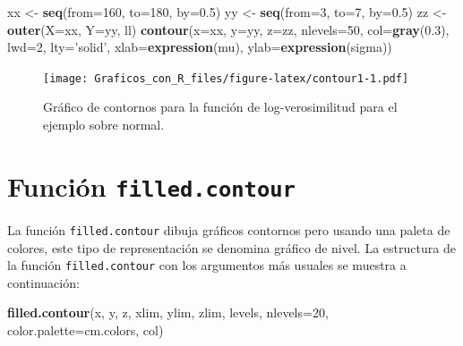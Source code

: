 \documentclass[10pt,]{krantz}
\makeatletter
\newenvironment{Shaded}{\begin{snugshade}}{\end{snugshade}}
\newcommand{\KeywordTok}[1]{\textcolor[rgb]{0.13,0.29,0.53}{\textbf{#1}}}
\newcommand{\DataTypeTok}[1]{\textcolor[rgb]{0.13,0.29,0.53}{#1}}
\newcommand{\DecValTok}[1]{\textcolor[rgb]{0.00,0.00,0.81}{#1}}
\newcommand{\FloatTok}[1]{\textcolor[rgb]{0.00,0.00,0.81}{#1}}
\newcommand{\StringTok}[1]{\textcolor[rgb]{0.31,0.60,0.02}{#1}}
\newcommand{\NormalTok}[1]{#1}
\newenvironment{kframe}{%
\medskip{}
\setlength{\fboxsep}{.8em}
 \def\at@end@of@kframe{}%
 \ifinner\ifhmode%
  \def\at@end@of@kframe{\end{minipage}}%
  \begin{minipage}{\columnwidth}%
 \fi\fi%
 \def\FrameCommand##1{\hskip\@totalleftmargin \hskip-\fboxsep
 \colorbox{shadecolor}{##1}\hskip-\fboxsep
     \hskip-\linewidth \hskip-\@totalleftmargin \hskip\columnwidth}%
 \MakeFramed {\advance\hsize-\width
   \@totalleftmargin\z@ \linewidth\hsize
   \@setminipage}}%
 {\par\unskip\endMakeFramed%
 \at@end@of@kframe}
\renewenvironment{Shaded}{\begin{kframe}}{\end{kframe}}
\makeatother
\begin{document}
\begin{Shaded}
\begin{Highlighting}[]
\NormalTok{xx <-}\StringTok{ }\KeywordTok{seq}\NormalTok{(}\DataTypeTok{from=}\DecValTok{160}\NormalTok{, }\DataTypeTok{to=}\DecValTok{180}\NormalTok{, }\DataTypeTok{by=}\FloatTok{0.5}\NormalTok{)}
\NormalTok{yy <-}\StringTok{ }\KeywordTok{seq}\NormalTok{(}\DataTypeTok{from=}\DecValTok{3}\NormalTok{, }\DataTypeTok{to=}\DecValTok{7}\NormalTok{, }\DataTypeTok{by=}\FloatTok{0.5}\NormalTok{)}
\NormalTok{zz <-}\StringTok{ }\KeywordTok{outer}\NormalTok{(}\DataTypeTok{X=}\NormalTok{xx, }\DataTypeTok{Y=}\NormalTok{yy, ll)}
\KeywordTok{contour}\NormalTok{(}\DataTypeTok{x=}\NormalTok{xx, }\DataTypeTok{y=}\NormalTok{yy, }\DataTypeTok{z=}\NormalTok{zz, }\DataTypeTok{nlevels=}\DecValTok{50}\NormalTok{,}
        \DataTypeTok{col=}\KeywordTok{gray}\NormalTok{(}\FloatTok{0.3}\NormalTok{), }\DataTypeTok{lwd=}\DecValTok{2}\NormalTok{, }\DataTypeTok{lty=}\StringTok{'solid'}\NormalTok{,}
        \DataTypeTok{xlab=}\KeywordTok{expression}\NormalTok{(mu), }\DataTypeTok{ylab=}\KeywordTok{expression}\NormalTok{(sigma))}
\end{Highlighting}
\end{Shaded}

\begin{figure}
\centering
\texttt{[image: Graficos\_con\_R\_files/figure-latex/contour1-1.pdf]}
\caption{\label{fig:contour1}Gráfico de contornos para la función de
log-verosimilitud para el ejemplo sobre normal.}
\end{figure}

\section{\texorpdfstring{Función \texttt{filled.contour}
}{Función filled.contour  }}\label{funcion-filled.contour}

La función \texttt{filled.contour} dibuja gráficos contornos pero usando
una paleta de colores, este tipo de representación se denomina gráfico
de nivel. La estructura de la función \texttt{filled.contour} con los
argumentos más usuales se muestra a continuación:

\begin{Shaded}
\begin{Highlighting}[]
\KeywordTok{filled.contour}\NormalTok{(x, y, z,}
\NormalTok{               xlim, ylim, zlim,}
\NormalTok{               levels, }\DataTypeTok{nlevels=}\DecValTok{20}\NormalTok{,}
               \DataTypeTok{color.palette=}\NormalTok{cm.colors, col)}
\end{Highlighting}
\end{Shaded}
\end{document}
